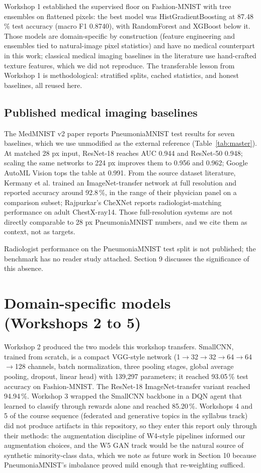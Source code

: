 \documentclass[11pt,a4paper]{article}
\begin{document}
Workshop 1 established the supervised floor on Fashion-MNIST with tree ensembles on flattened pixels: the best model was HistGradientBoosting at 87.48\,\% test accuracy (macro F1 0.8740), with RandomForest and XGBoost below it. Those models are domain-specific by construction (feature engineering and ensembles tied to natural-image pixel statistics) and have no medical counterpart in this work; classical medical imaging baselines in the literature use hand-crafted texture features, which we did not reproduce. The transferable lesson from Workshop 1 is methodological: stratified splits, cached statistics, and honest baselines, all reused here.

\subsection{Published medical imaging baselines}

The MedMNIST v2 paper reports PneumoniaMNIST test results for seven baselines, which we use unmodified as the external reference (Table~\ref{tab:master}). At matched 28 px input, ResNet-18 reaches AUC 0.944 and ResNet-50 0.948; scaling the same networks to 224 px improves them to 0.956 and 0.962; Google AutoML Vision tops the table at 0.991. From the source dataset literature, Kermany et al. trained an ImageNet-transfer network at full resolution and reported accuracy around 92.8\,\%, in the range of their physician panel on a comparison subset; Rajpurkar's CheXNet reports radiologist-matching performance on adult ChestX-ray14. Those full-resolution systems are not directly comparable to 28 px PneumoniaMNIST numbers, and we cite them as context, not as targets.

Radiologist performance on the PneumoniaMNIST test split is not published; the benchmark has no reader study attached. Section 9 discusses the significance of this absence.

\section{Domain-specific models (Workshops 2 to 5)}

Workshop 2 produced the two models this workshop transfers. SmallCNN, trained from scratch, is a compact VGG-style network (1$\to$32$\to$32$\to$64$\to$64$\to$128 channels, batch normalization, three pooling stages, global average pooling, dropout, linear head) with 139{,}297 parameters; it reached 93.05\,\% test accuracy on Fashion-MNIST. The ResNet-18 ImageNet-transfer variant reached 94.94\,\%. Workshop 3 wrapped the SmallCNN backbone in a DQN agent that learned to classify through rewards alone and reached 85.20\,\%. Workshops 4 and 5 of the course sequence (federated and generative topics in the syllabus track) did not produce artifacts in this repository, so they enter this report only through their methods: the augmentation discipline of W4-style pipelines informed our augmentation choices, and the W5 GAN track would be the natural source of synthetic minority-class data, which we note as future work in Section 10 because PneumoniaMNIST's imbalance proved mild enough that re-weighting sufficed.
\end{document}
